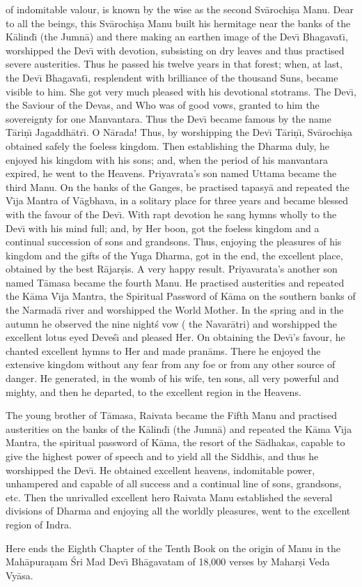 of indomitable valour, is known by the wise as the second Sv\=arochi\d{s}a Manu. Dear to all the beings, this Sv\=arochi\d{s}a Manu built his hermitage near the banks of the K\=alind\={\i} (the Jumn\=a) and there making an earthen image of the Dev\={\i} Bhagavat\={\i}, worshipped the Dev\={\i} with devotion, subsisting on dry leaves and thus practised severe austerities. Thus he passed his twelve years in that forest; when, at last, the Dev\={\i} Bhagavat\={\i}, resplendent with brilliance of the thousand Suns, became visible to him. She got very much pleased with his devotional stotrams. The Dev\={\i}, the Saviour of the Devas, and Who was of good vows, granted to him the sovereignty for one Manvantara. Thus the Dev\={\i} became famous by the name T\=ari\d{n}\={\i} Jagaddh\=atr\={\i}. O N\=arada! Thus, by worshipping the Dev\={\i} T\=ari\d{n}\={\i}, Sv\=arochi\d{s}a obtained safely the foeless kingdom. Then establishing the Dharma duly, he enjoyed his kingdom with his sons; and, when the period of his manvantara expired, he went to the Heavens. Priyavrata's son named Uttama became the third Manu. On the banks of the Ganges, be practised tapasy\=a and repeated the V\={\i}ja Mantra of V\=agbhava, in a solitary place for three years and became blessed with the favour of the Dev\={\i}. With rapt devotion he sang hymns wholly to the Dev\={\i} with his mind full; and, by Her boon, got the foeless kingdom and a continual succession of sons and grandsons. Thus, enjoying the pleasures of his kingdom and the gifts of the Yuga Dharma, got in the end, the excellent place, obtained by the best R\=ajar\d{s}is. A very happy result. Priyavarata's another son named T\=amasa became the fourth Manu. He practised austerities and repeated the K\=ama V\={\i}ja Mantra, the Spiritual Password of K\=ama on the southern banks of the Narmad\=a river and worshipped the World Mother. In the spring and in the autumn he observed the nine night\'s vow ( the Navar\=atri) and worshipped the excellent lotus eyed Deve\'s\={\i} and pleased Her. On obtaining the Dev\={\i}'s favour, he chanted excellent hymns to Her and made pran\=ams. There he enjoyed the extensive kingdom without any fear from any foe or from any other source of danger. He generated, in the womb of his wife, ten sons, all very powerful and mighty, and then he departed, to the excellent region in the Heavens.

The young brother of T\=amasa, Raivata became the Fifth Manu and practised austerities on the banks of the K\=alind\={\i} (the Jumn\=a) and repeated the K\=ama V\={\i}ja Mantra, the spiritual password of K\=ama, the resort of the S\=adhakas, capable to give the highest power of speech and to yield all the Siddhis, and thus he worshipped the Dev\={\i}. He obtained excellent heavens, indomitable power, unhampered and capable of all success and a continual line of sons, grandsons, etc. Then the unrivalled excellent hero Raivata Manu established the several divisions of Dharma and enjoying all the worldly pleasures, went to the excellent region of Indra.

Here ends the Eighth Chapter of the Tenth Book on the origin of Manu in the Mah\=apura\d{n}am \'Sri Mad Dev\={\i} Bh\=agavatam of 18,000 verses by Mahar\d{s}i Veda Vy\=asa.



